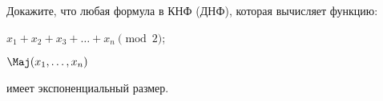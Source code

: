 Докажите, что любая формула в КНФ (ДНФ), которая вычисляет функцию:
\begin{enumcyr}
    \item $x_1 + x_2 + x_3 + \dots + x_n  \pmod 2$;
    \item $\Maj(x_1, \dots, x_n)$
\end{enumcyr}
имеет экспоненциальный размер.